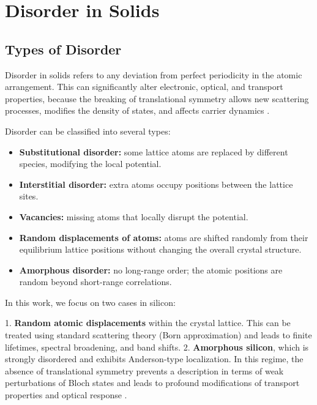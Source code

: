 \chapter{Disorder in Solids}
\label{chap:disorder}



\section{Types of Disorder}

Disorder in solids refers to any deviation from perfect periodicity in the atomic arrangement. This can significantly alter electronic, optical, and transport properties, because the breaking of translational symmetry allows new scattering processes, modifies the density of states, and affects carrier dynamics \cite{Mahan2000,Kittel2005}.  

Disorder can be classified into several types:

\begin{itemize}
    \item \textbf{Substitutional disorder:} some lattice atoms are replaced by different species, modifying the local potential.
    \item \textbf{Interstitial disorder:} extra atoms occupy positions between the lattice sites.
    \item \textbf{Vacancies:} missing atoms that locally disrupt the potential.
    \item \textbf{Random displacements of atoms:} atoms are shifted randomly from their equilibrium lattice positions without changing the overall crystal structure.
    \item \textbf{Amorphous disorder:} no long-range order; the atomic positions are random beyond short-range correlations.
\end{itemize}

In this work, we focus on two cases in silicon:

1. \textbf{Random atomic displacements} within the crystal lattice. This can be treated using standard scattering theory (Born approximation) and leads to finite lifetimes, spectral broadening, and band shifts.
2. \textbf{Amorphous silicon}, which is strongly disordered and exhibits Anderson-type localization. In this regime, the absence of translational symmetry prevents a description in terms of weak perturbations of Bloch states and leads to profound modifications of transport properties and optical response \cite{Anderson1958,Economou2006,You2017}.

